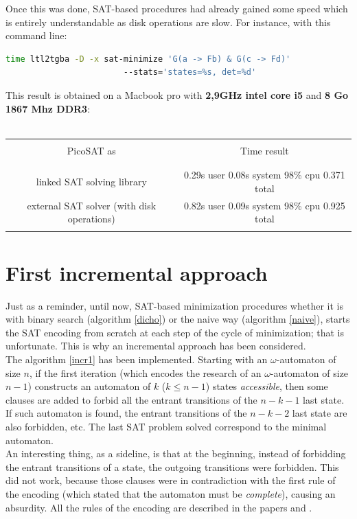 Once this was done, SAT-based procedures had already gained some speed which is entirely understandable as
disk operations are slow. For instance, with this command
line:
\begin{lstlisting}[language=bash,caption={bash command-line to test a formula minimization using ltl2tgba}]
  time ltl2tgba -D -x sat-minimize 'G(a -> Fb) & G(c -> Fd)'
                        --stats='states=%s, det=%d'
\end{lstlisting}
This result is obtained on a Macbook pro with \textbf{2,9GHz intel core i5} and
\textbf{8 Go 1867 Mhz DDR3}:\\\\
\begin{tabular}{|c|c|}
 \hline
 &\\
 PicoSAT as & Time result\\
 &\\
 \hline
 &\\
 linked SAT solving library&0.29s user 0.08s system 98\% cpu 0.371 total\\
 external SAT solver (with disk operations)&0.82s user 0.09s system 98\% cpu 0.925 total\\
 &\\
 \hline
\end{tabular}

\section{First incremental approach}
\label{approach1}
Just as a reminder, until now, SAT-based minimization procedures whether it is with binary search
(algorithm \ref{dicho}) or the naive way (algorithm \ref{naive}), starts the SAT encoding from scratch
at each step of the cycle of minimization; that is unfortunate. This is why an incremental approach
has been considered.\\

\noindent  The algorithm \ref{incr1} has been implemented. Starting with an $\omega$-automaton of size
$n$, if the first iteration (which encodes the research of an $\omega$-automaton of size $n-1$) constructs
an automaton of $k$ ($k \leq n-1$) states \textit{accessible}, then some clauses are added to forbid all the
entrant transitions of the $n-k-1$ last state. If such automaton is found, the entrant transitions of the
$n-k-2$ last state are also forbidden, etc. The last SAT problem solved correspond to the minimal
automaton.\\

\noindent An interesting thing, as a sideline, is that at the beginning, instead of forbidding the entrant
transitions of a state, the outgoing transitions were forbidden. This did not work, because those
clauses were in contradiction with the first rule of the encoding (which stated that the automaton must be
\textit{complete}), causing an absurdity. All the rules of the encoding are described in the papers
\cite{14} and \cite{15}.\\


